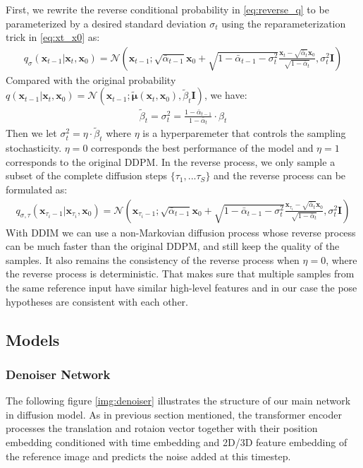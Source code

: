 \documentclass[12pt,DIV14,BCOR12mm,a4paper,footinclude=false,headinclude,parskip=half-,twoside,openright,cleardoublepage=empty,toc=index,bibliography=totoc,listof=totoc]{scrreprt}
\numberwithin{equation}{chapter}
\begin{document}
First, we rewrite the reverse conditional probability in \ref{eq:reverse_q} to be parameterized by a desired standard deviation $\sigma_{t}$ using the reparameterization trick in \ref{eq:xt_x0} as:
\begin{align}
  q_{\sigma}(\mathbf{x}_{t-1}|\mathbf{x}_{t},\mathbf{x}_{0}) = \mathcal{N} (\mathbf{x}_{t-1}; \sqrt{\bar{\alpha}_{t-1}}\mathbf{x}_{0}+\sqrt{1-\bar{\alpha}_{t-1} - \sigma_{t}^{2}}\frac{\mathbf{x}_{t}-\sqrt{\bar{\alpha}_{t}}\mathbf{x}_{0}}{\sqrt{1-\bar{\alpha}_{t}}}, \sigma_{t}^{2}\mathbf{I})
\end{align}
Compared with the original probability $q(\mathbf{x}_{t-1}|\mathbf{x}_{t},\mathbf{x}_{0}) = \mathcal{N} (\mathbf{x}_{t-1}; \boldsymbol{\tilde{\mu}}(\mathbf{x}_{t}, \mathbf{x}_{0}), \tilde{\beta}_{t}\mathbf{I})$, we have:
\begin{align}
  \tilde{\beta}_{t}=\sigma_{t}^{2}=\frac{1-\bar{\alpha}_{t-1}}{1-\bar{\alpha}_{t}}\cdot\beta_{t}
\end{align}
Then we let $\sigma_{t}^{2}=\eta\cdot\tilde{\beta}_{t}$ where $\eta$ is a hyperparemeter that controls the sampling stochasticity. $\eta=0$ corresponds the best performance of the model and $\eta=1$ corresponds to the original DDPM. In the reverse process, we only sample a subset of the complete diffusion steps $\{\tau_{1},...\tau_{S}\}$ and the reverse process can be formulated as:
\begin{align}
  q_{\sigma,\tau}(\mathbf{x}_{\tau_{i}-1}|\mathbf{x}_{\tau_{i}},\mathbf{x}_{0}) = \mathcal{N} (\mathbf{x}_{\tau_{i}-1}; \sqrt{\bar{\alpha}_{t-1}}\mathbf{x}_{0}+\sqrt{1-\bar{\alpha}_{t-1} - \sigma_{t}^{2}}\frac{\mathbf{x}_{\tau_{i}}-\sqrt{\bar{\alpha}_{t}}\mathbf{x}_{0}}{\sqrt{1-\bar{\alpha}_{t}}}, \sigma_{t}^{2}\mathbf{I})
\end{align}
With DDIM we can use a non-Markovian diffusion process whose reverse process can be much faster than the original DDPM, and still keep the quality of the samples. It also remains the consistency of the reverse process when $\eta=0$, where the reverse process is deterministic. That makes sure that multiple samples from the same reference input have similar high-level features and in our case the pose hypotheses are consistent with each other.
\subsection{Models}
\subsubsection{Denoiser Network}
The following figure \ref{img:denoiser} illustrates the structure of our main network in diffusion model. As in previous section mentioned, the transformer encoder processes the translation and rotaion vector together with their position embedding conditioned with time embedding and 2D/3D feature embedding of the reference image and predicts the noise added at this timestep. 
\end{document}
